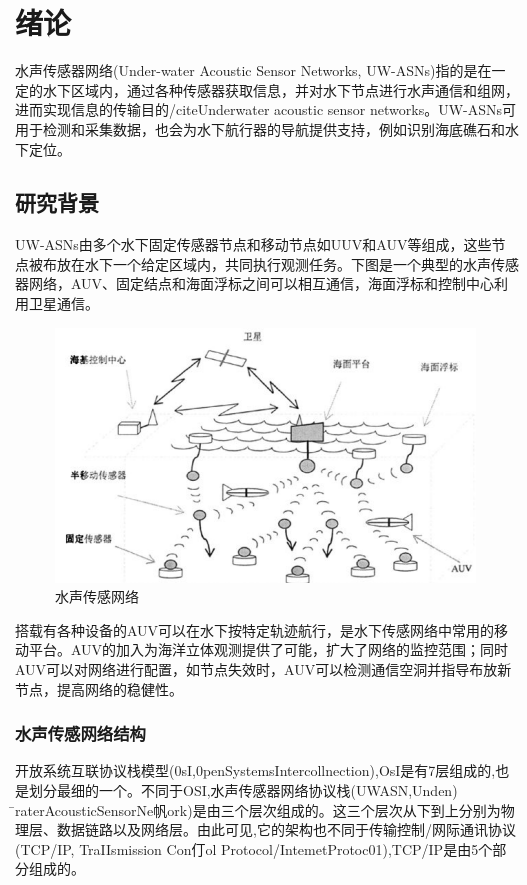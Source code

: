 \chapter{绪论}
水声传感器网络(Under-water Acoustic Sensor Networks, UW-ASNs)指的是在一定的水下区域内，通过各种传感器获取信息，并对水下节点进行水声通信和组网，进而实现信息的传输目的/cite{Underwater acoustic sensor networks}。UW-ASNs可用于检测和采集数据，也会为水下航行器的导航提供支持，例如识别海底礁石和水下定位。


\section{研究背景}
UW-ASNs由多个水下固定传感器节点和移动节点如UUV和AUV等组成，这些节点被布放在水下一个给定区域内，共同执行观测任务。下图是一个典型的水声传感器网络，AUV、固定结点和海面浮标之间可以相互通信，海面浮标和控制中心利用卫星通信。
\begin{figure}[ht]
	\centering
	\includegraphics[scale=0.8]{figures/1.png}
	\caption{
		水声传感网络
	}
	\label{fig:example}
\end{figure}

搭载有各种设备的AUV可以在水下按特定轨迹航行，是水下传感网络中常用的移动平台。AUV的加入为海洋立体观测提供了可能，扩大了网络的监控范围；同时AUV可以对网络进行配置，如节点失效时，AUV可以检测通信空洞并指导布放新节点，提高网络的稳健性。

\subsection{水声传感网络结构}
开放系统互联协议栈模型(0sI,0penSystemsIntercollnection),OsI是有7层组成的,也是划分最细的一个。不同于OSI,水声传感器网络协议栈(UWASN,Unden) ̄raterAcousticSensorNe帆ork)是由三个层次组成的。这三个层次从下到上分别为物理层、数据链路以及网络层。由此可见,它的架构也不同于传输控制/网际通讯协议(TCP/IP,
TraIIsmission Con仃ol Protocol/IntemetProtoc01),TCP/IP是由5个部分组成的。

